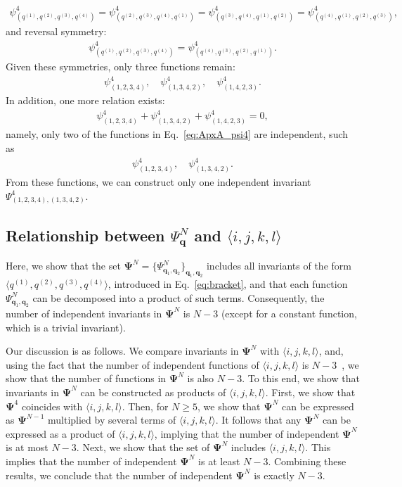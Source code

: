 \documentclass[
amsmath,amssymb,
]{revtex4-2}
\begin{document}
\begin{align}
    \psi^4_{(q^{(1)}, q^{(2)}, q^{(3)}, q^{(4)})} 
    = \psi^4_{(q^{(2)}, q^{(3)}, q^{(4)}, q^{(1)})} 
    = \psi^4_{(q^{(3)}, q^{(4)}, q^{(1)}, q^{(2)})} 
    = \psi^4_{(q^{(4)}, q^{(1)}, q^{(2)}, q^{(3)})},
\end{align}
and reversal symmetry:
\begin{align}
    \psi^4_{(q^{(1)}, q^{(2)}, q^{(3)}, q^{(4)})}
    = \psi^4_{(q^{(4)}, q^{(3)}, q^{(2)}, q^{(1)})}.
\end{align}
Given these symmetries, only three functions remain:
\begin{align}
    \label{eq:ApxA_psi4}
    \psi^4_{(1,2,3,4)}, \quad
    \psi^4_{(1,3,4,2)}, \quad
    \psi^4_{(1,4,2,3)}.
\end{align}
In addition, one more relation exists:
\begin{align}
    \psi^4_{(1,2,3,4)} + \psi^4_{(1,3,4,2)} + \psi^4_{(1,4,2,3)} = 0,
\end{align}
namely, only two of the functions in Eq.~\eqref{eq:ApxA_psi4} are independent, such as
\begin{align}
        \psi^4_{(1,2,3,4)}, \quad  \psi^4_{(1,3,4,2)}.
\end{align}
%
From these functions, we can construct only one independent invariant $\Psi^4_{(1,2,3,4), (1,3,4,2)}$. 

\subsection{\texorpdfstring
  {Relationship between $\Psi^N_{\bm{q}}$ and $\langle i,j,k,l\rangle$}
  {Relationship between Psi^N_q and <i,j,k,l>}
}

Here, we show that the set $\bm{\Psi}^N = \{\Psi^N_{\bm{q}_1, \bm{q}_2}\}_{\bm{q}_1, \bm{q}_2}$ includes all invariants of the form $\langle q^{(1)}, q^{(2)}, q^{(3)}, q^{(4)}\rangle$, introduced in Eq.~\eqref{eq:bracket},
and that each function $\Psi^N_{\bm{q}_1, \bm{q}_2}$ can be decomposed into a product of such terms. Consequently, the number of independent invariants in $\bm{\Psi}^N$ is $N - 3$ (except for a constant function, which is a trivial invariant).

Our discussion is as follows. We compare invariants in $\bm{\Psi}^N$ with $\langle i,j,k,l\rangle$, and, using the fact that the number of independent functions of $\langle i,j,k,l\rangle$ is $N-3$~\cite{Marvel2009identical}, we show that the number of functions in $\bm{\Psi}^N$ is also $N-3$.  
To this end, we show that invariants in $\bm{\Psi}^N$ can be constructed as products of $\langle i,j,k,l\rangle$. 
First, we show that $\bm{\Psi}^4$ coincides with $\langle i,j,k,l\rangle$. Then, for $N \geq 5$, we show that $\bm{\Psi}^N$ can be expressed as $\bm{\Psi}^{N-1}$ multiplied by several terms of $\langle i,j,k,l\rangle$.  
It follows that any $\bm{\Psi}^N$ can be expressed as a product of $\langle i,j,k,l\rangle$, implying that the number of independent $\bm{\Psi}^N$ is at most $N-3$.  
Next, we show that the set of $\bm{\Psi}^N$ includes $\langle i,j,k,l\rangle$. This implies that the number of independent $\bm{\Psi}^N$ is at least $N-3$.  
Combining these results, we conclude that the number of independent $\bm{\Psi}^N$ is exactly $N-3$.
\end{document}
